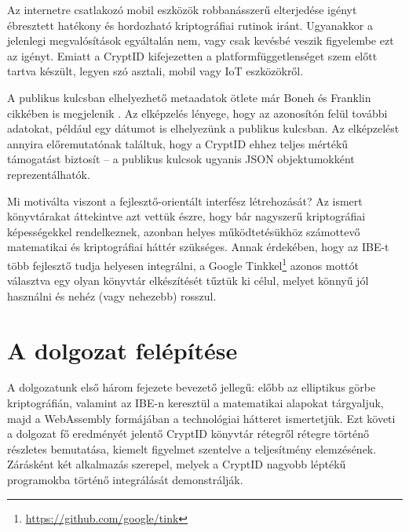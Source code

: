 Az internetre csatlakozó mobil eszközök robbanásszerű elterjedése igényt ébresztett hatékony és hordozható kriptográfiai rutinok iránt. Ugyanakkor a jelenlegi megvalósítások egyáltalán nem, vagy csak kevésbé veszik figyelembe ezt az igényt. Emiatt a CryptID kifejezetten a platformfüggetlenséget szem előtt tartva készült, legyen szó asztali, mobil vagy IoT eszközökről.

A publikus kulcsban elhelyezhető metaadatok ötlete már Boneh és Franklin cikkében is megjelenik \citeyear{Boneh::IdentityBasedEncryptionFromTheWeilPairing}. Az elképzelés lényege, hogy az azonosítón felül további adatokat, például egy dátumot is elhelyezünk a publikus kulcsban. Az elképzelést annyira előremutatónak találtuk, hogy a CryptID ehhez teljes mértékű támogatást biztosít – a publikus kulcsok ugyanis JSON objektumokként reprezentálhatók.

Mi motiválta viszont a fejlesztő-orientált interfész létrehozását? Az ismert könyvtárakat áttekintve azt vettük észre, hogy bár nagyszerű kriptográfiai képességekkel rendelkeznek, azonban helyes működtetésükhöz számottevő matematikai és kriptográfiai háttér szükséges. Annak érdekében, hogy az IBE-t több fejlesztő tudja helyesen integrálni, a \mbox{Google} Tinkkel\footnote{\url{https://github.com/google/tink}} azonos mottót választva egy olyan könyvtár elkészítését tűztük ki célul, melyet könnyű jól használni és nehéz (vagy nehezebb) rosszul.

\section{A dolgozat felépítése}

A dolgozatunk első három fejezete bevezető jellegű: előbb az elliptikus görbe kriptográfián, valamint az IBE-n keresztül a matematikai alapokat tárgyaljuk, majd a WebAssembly formájában a technológiai hátteret ismertetjük. Ezt követi a dolgozat fő eredményét jelentő CryptID könyvtár rétegről rétegre történő részletes bemutatása, kiemelt figyelmet szentelve a teljesítmény elemzésének. Zárásként két alkalmazás szerepel, melyek a Crypt\-ID nagyobb léptékű programokba történő integrálását demonstrálják.
